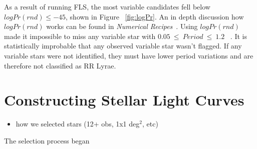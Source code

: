 \documentclass[aps,prb,twocolumn,superscriptaddress]{revtex4-1}
\begin{document}
As a result of running FLS, the most variable candidates fell below $logPr(rnd)\leq-45$, shown in Figure ~\ref{fig:logPr}.
An in depth discussion how $logPr(rnd)$ works can be found in \textit{Numerical Recipes}~\cite{logPr, Numerical}.  Using $logPr(rnd)$ made it impossible 
to miss any variable star with $0.05~\leq~Period~\leq~1.2$ ~\cite{AAVSO}.  It is statistically improbable that any observed variable star wasn't flagged.  If any variable stars were not identified, they must have lower period variations and are therefore not classified as RR Lyrae.

\section{Constructing Stellar Light Curves}


\begin{itemize}
	\item{} how we selected stars (12+ obs, 1x1 deg$^2$, etc)
\end{itemize}

The selection process began


\end{document}
